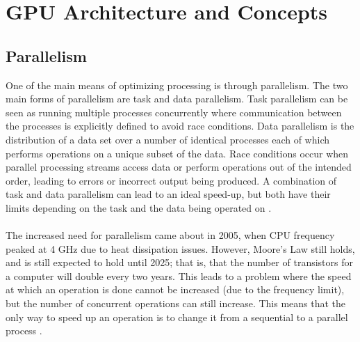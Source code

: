 \section{GPU Architecture and Concepts}\label{gpu}
\subsection{Parallelism}\label{gpu:sec:par}
One of the main means of optimizing processing is through parallelism. The two main forms of parallelism are task and data parallelism. Task parallelism can be seen as running multiple processes concurrently where communication between the processes is explicitly defined to avoid race conditions. Data parallelism is the distribution of a data set over a number of identical processes each of which performs operations on a unique subset of the data. Race conditions occur when parallel processing streams access data or perform operations out of the intended order, leading to errors or incorrect output being produced. A combination of task and data parallelism can lead to an ideal speed-up, but both have their limits depending on the task and the data being operated on \citep{subhlok1993exploiting}.
\\
\\
The increased need for parallelism came about in 2005, when CPU frequency peaked at 4 GHz due to heat dissipation issues. However, Moore's Law still holds, and is still expected to hold until 2025; that is, that the number of transistors for a computer will double every two years. This leads to a problem where the speed at which an operation is done cannot be increased (due to the frequency limit), but the number of concurrent operations can still increase. This means that the only way to speed up an operation is to change it from a sequential to a parallel process \citep{rajan2013informatics}.

